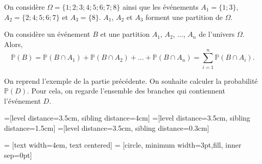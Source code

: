 \documentclass[11pt,fleqn, openany]{book} %
\begin{document}
\begin{example}On considère $\Omega = \{1;2;3;4;5;6;7;8\}$ ainsi que les événements $A_1=\{1;3\}$, \\ $A_2=\{2;4;5;6;7\}$ et $A_3=\{8\}$. $A_1$, $A_2$ et $A_3$ forment une partition de $\Omega$.\end{example}

\begin{proposition} On considère un événement $B$ et une partition $A_1$, $A_2$, ..., $A_n$ de l'univers $\Omega$. Alors,
\[ \mathbb{P}(B)=\mathbb{P}(B \cap A_1) + \mathbb{P}(B \cap A_2) + \ldots + \mathbb{P}(B \cap A_n) = \sum_{i=1}^{n} \mathbb{P}(B\cap A_i).\]
\end{proposition}


\begin{example} On reprend l'exemple de la partie précédente. On souhaite calculer la probabilité $\mathbb{P}(D)$. Pour cela, on regarde l'ensemble des branches qui contiennent l'événement $D$.

=[level distance=3.5cm, sibling distance=4cm]
=[level distance=3.5cm, sibling distance=1.5cm]
=[level distance=3.5cm, sibling distance=0.3cm]

 = [text width=4em, text centered]
 = [circle, minimum width=3pt,fill, inner sep=0pt]



\end{example}
\end{document}
